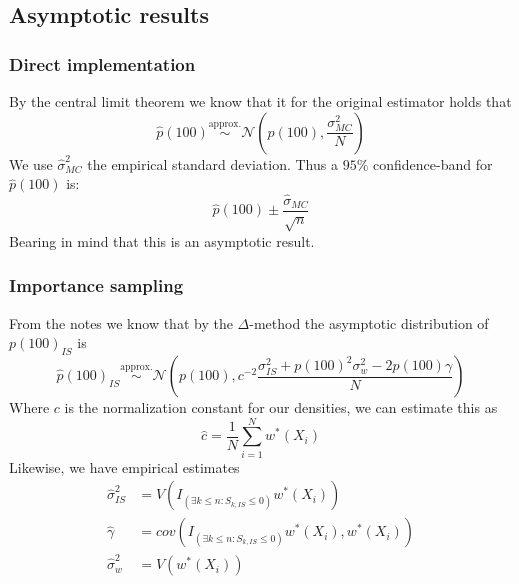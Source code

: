 \documentclass[a4paper, 11 pt]{article}
\begin{document}
\subsection{Asymptotic results}
\subsubsection{Direct implementation}
By the central limit theorem we know that it for the original estimator holds that
\[
    \hat{p}(100) \overset{\text{approx.}}{\sim} \mathcal{N}\left(p(100), \frac{\sigma_{MC}^2}{N}\right)    
\]
We use $\hat{\sigma}_{MC}^2$ the empirical standard deviation. Thus a $95\%$ confidence-band for $\hat{p}(100)$ is:
\[
    \hat{p}(100) \pm \frac{\hat{\sigma}_{MC}}{\sqrt{n}} 
\]
Bearing in mind that this is an asymptotic result.
\subsubsection{Importance sampling}
From the notes we know that by the $\Delta$-method the asymptotic distribution of $p(100)_{IS}$ is
\[
    \hat{p}(100)_{IS} \overset{\text{approx.}}{\sim} \mathcal{N}\left(p(100), c^{-2}\frac{\sigma_{IS}^2 + p(100)^2 \sigma_w^2-2p(100)\gamma}{N}\right)    
\]
Where $c$ is the normalization constant for our densities, we can estimate this as
\[
    \hat{c} = \frac{1}{N}\sum_{i = 1}^N w^*(X_i)    
\]
Likewise, we have empirical estimates
\begin{align*}
    \hat{\sigma}_{IS}^2 &= V(I_{\left(\exists k\leq n :S_{k,IS}\leq 0\right)}w^*(X_i))\\
    \hat{\gamma} &= cov(I_{\left(\exists k\leq n :S_{k,IS}\leq 0\right)}w^*(X_i), w^*(X_i))\\
    \hat{\sigma}_{w}^2 &= V(w^*(X_i))
\end{align*}
\end{document}
